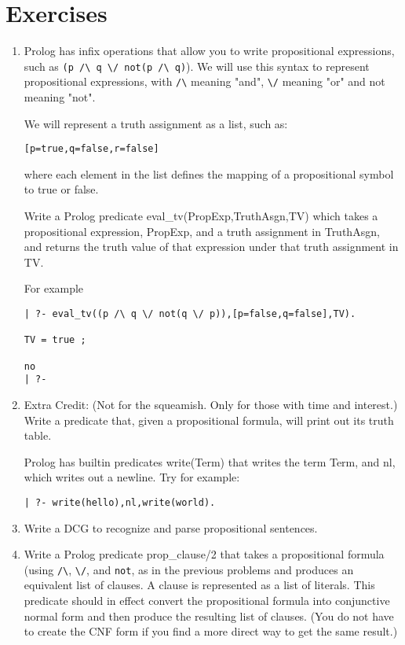 \section{Exercises}

\begin{enumerate}
\item
Prolog has infix operations that allow you to write propositional
expressions, such as \verb|(p /\ q \/ not(p /\ q)|).  We will use this syntax
to represent propositional expressions, with \verb|/\| meaning "and", \verb|\/|
meaning "or" and not meaning "not".

We will represent a truth assignment as a list, such as:
\begin{verbatim}
[p=true,q=false,r=false]
\end{verbatim}
where each element in the list defines the mapping of a propositional
symbol to true or false.

Write a Prolog predicate eval\_tv(PropExp,TruthAsgn,TV) which takes a
propositional expression, PropExp, and a truth assignment in
TruthAsgn, and returns the truth value of that expression under that
truth assignment in TV.

For example 
\begin{verbatim}
| ?- eval_tv((p /\ q \/ not(q \/ p)),[p=false,q=false],TV).

TV = true ;

no
| ?- 
\end{verbatim}

\item
Extra Credit: (Not for the squeamish.  Only for those with time and
interest.)  Write a predicate that, given a propositional formula,
will print out its truth table.

Prolog has builtin predicates write(Term) that writes the term Term,
and nl, which writes out a newline.  Try for example:
\begin{verbatim}
| ?- write(hello),nl,write(world).
\end{verbatim}

\item
Write a DCG to recognize and parse propositional sentences.

\item
Write a Prolog predicate prop\_clause/2 that takes a propositional
formula (using \verb|/\|, \verb|\/|, and \verb|not|, as in the
previous problems and produces an equivalent list of clauses.  A
clause is represented as a list of literals.  This predicate should in
effect convert the propositional formula into conjunctive normal form
and then produce the resulting list of clauses.  (You do not have to
create the CNF form if you find a more direct way to get the same
result.)


\end{enumerate}
